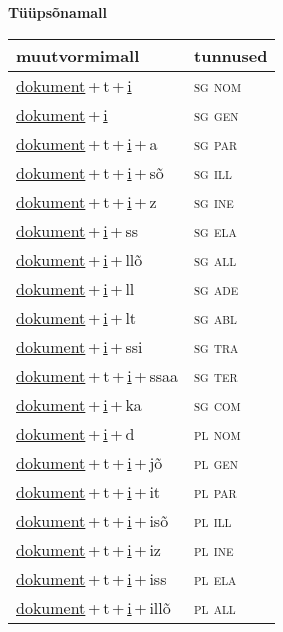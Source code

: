 
\vspace{1.8em}
\begin{minipage}{\textwidth}
\textbf{Tüüpsõnamall \,}\\

\begin{sideways}
\begin{tabular}{l l}
muutvormimall & tunnused \\
\hline
\underline{dokument}\,+\,t\,+\,\underline{i} & \textsc{ sg nom } \\
\underline{dokument}\,+\,\underline{i} & \textsc{ sg gen } \\
\underline{dokument}\,+\,t\,+\,\underline{i}\,+\,a & \textsc{ sg par } \\
\underline{dokument}\,+\,t\,+\,\underline{i}\,+\,sõ & \textsc{ sg ill } \\
\underline{dokument}\,+\,t\,+\,\underline{i}\,+\,z & \textsc{ sg ine } \\
\underline{dokument}\,+\,\underline{i}\,+\,ss & \textsc{ sg ela } \\
\underline{dokument}\,+\,\underline{i}\,+\,llõ & \textsc{ sg all } \\
\underline{dokument}\,+\,\underline{i}\,+\,ll & \textsc{ sg ade } \\
\underline{dokument}\,+\,\underline{i}\,+\,lt & \textsc{ sg abl } \\
\underline{dokument}\,+\,\underline{i}\,+\,ssi & \textsc{ sg tra } \\
\underline{dokument}\,+\,t\,+\,\underline{i}\,+\,ssaa & \textsc{ sg ter } \\
\underline{dokument}\,+\,\underline{i}\,+\,ka & \textsc{ sg com } \\
\underline{dokument}\,+\,\underline{i}\,+\,d & \textsc{ pl nom } \\
\underline{dokument}\,+\,t\,+\,\underline{i}\,+\,jõ & \textsc{ pl gen } \\
\underline{dokument}\,+\,t\,+\,\underline{i}\,+\,it & \textsc{ pl par } \\
\underline{dokument}\,+\,t\,+\,\underline{i}\,+\,isõ & \textsc{ pl ill } \\
\underline{dokument}\,+\,t\,+\,\underline{i}\,+\,iz & \textsc{ pl ine } \\
\underline{dokument}\,+\,t\,+\,\underline{i}\,+\,iss & \textsc{ pl ela } \\
\underline{dokument}\,+\,t\,+\,\underline{i}\,+\,illõ & \textsc{ pl all } \\

\end{tabular}
\end{sideways}
\end{minipage}
